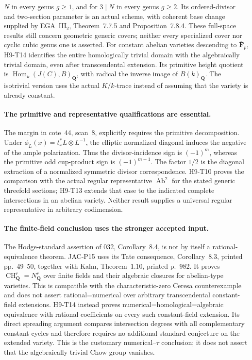 $N$ in every genus $g\ge1$, and for $3\mid N$ in every genus
$g\ge2$. Its ordered-divisor and two-section parameter is an actual
scheme, with coherent base change supplied by EGA~III$_2$,
Theorem~7.7.5 and Proposition~7.8.4. These full-space results still
concern geometric generic covers; neither every specialized cover
nor cyclic cubic genus one is asserted.
For constant abelian varieties descending to
$\overline{\mathbf F}_p$, H9-T14 identifies the entire homologically
trivial domain with the algebraically trivial domain, even after
transcendental extension. Its primitive height quotient is
$\operatorname{Hom}_k(J(C),B)_{\mathbf Q}$, with radical the
inverse image of $B(k)_{\mathbf Q}$. The isotrivial version uses
the actual $K/k$-trace instead of assuming that the variety is
already constant.

\paragraph{The primitive and representative qualifications are essential.}
The margin in cote~44, scan~8, explicitly requires the primitive
decomposition. Under $\phi_L(x)=t_x^*L\otimes L^{-1}$, the
elliptic normalized diagonal induces the negative of the ample
polarization. Thus the divisor-incidence sign is $(-1)^m$,
whereas the primitive odd cup-product sign is $(-1)^{m-1}$.
The factor $1/2$ is the diagonal extraction of a normalized
symmetric divisor correspondence. H9-T10 proves the comparison
with the actual regular representative $\operatorname{Ab}^2$
for the stated generic threefold sections; H9-T13 extends that
case to the indicated complete intersections in an abelian variety.
Neither result supplies a universal regular representative in
arbitrary codimension.

\paragraph{The finite-field conclusion uses the stronger accepted input.}
The Hodge-standard assertion of 032, Corollary~8.4, is not by
itself a rational-equivalence theorem. JAC-P15 uses its Tate
consequence, Corollary~8.3, printed pp.~49--50, together with
Kahn, Theorem~1.10, printed p.~982. It proves
$\operatorname{CH}^r_{\mathbf Q}=N^r_{\mathbf Q}$ over finite
fields and their algebraic closures for abelian-type varieties.
This is compatible with the characteristic-zero Ceresa
counterexample and does not assert rational=numerical over
arbitrary transcendental constant-field extensions.
H9-T14 instead proves numerical=homological=algebraic equivalence
with rational coefficients on every such constant-field
extension. Its direct spreading argument compares intersection
degrees with all complementary constant cycles and therefore
requires no additional standard conjecture on the extended
variety. This is the customary numerical--$\tau$ conclusion;
it does not assert that the algebraically trivial Chow group vanishes.

